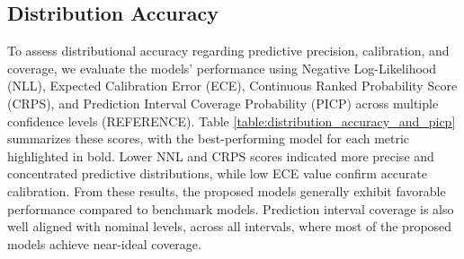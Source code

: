 

\subsection{Distribution Accuracy}
\label{sec:distribution_accuracy}

To assess distributional accuracy regarding predictive precision, calibration, and coverage, we evaluate the models' performance using Negative Log-Likelihood (NLL), Expected Calibration Error (ECE), Continuous Ranked Probability Score (CRPS), and Prediction Interval Coverage Probability (PICP) across multiple confidence levels (REFERENCE). Table \ref{table:distribution_accuracy_and_picp} summarizes these scores, with the best-performing model for each metric highlighted in bold. Lower NNL and CRPS scores indicated more precise and concentrated predictive distributions, while low ECE value confirm accurate calibration. From these results, the proposed models generally exhibit favorable performance compared to benchmark models. 
Prediction interval coverage is also well aligned with nominal levels, across all intervals, where most of the proposed models achieve near-ideal coverage.


